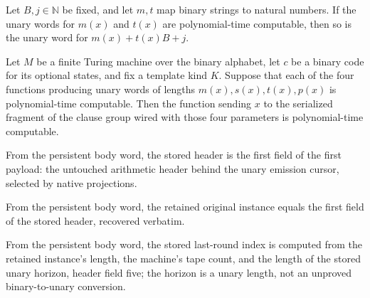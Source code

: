 \begin{lemma}
\label{Complexity.clA5Address_native}
\leanok
{}
Let $B,j\in\mathbb{N}$ be fixed, and let $m,t$ map binary strings to natural numbers. If
the unary words for $m(x)$ and $t(x)$ are polynomial-time computable, then so is the
unary word for $m(x)+t(x)B+j$.
\end{lemma}

\begin{lemma}
\label{Complexity.clA5Group_native}
\leanok
{}
Let $M$ be a finite Turing machine over the binary alphabet, let $c$ be a binary code
for its optional states, and fix a template kind $K$. Suppose that each of the four
functions producing unary words of lengths $m(x),s(x),t(x),p(x)$ is polynomial-time
computable. Then the function sending $x$ to the serialized fragment of the clause group
wired with those four parameters is polynomial-time computable.
\end{lemma}

\begin{definition}
\label{Complexity.clA5StoredHeader}
\leanok
{}
From the persistent body word, the stored header is the first field of the first payload: the untouched arithmetic header behind the unary emission cursor, selected by native projections.
\end{definition}

\begin{definition}
\label{Complexity.clA5Instance}
\leanok
{}
From the persistent body word, the retained original instance equals the first field of the stored header, recovered verbatim.
\end{definition}

\begin{definition}
\label{Complexity.clA5StoredRound}
\leanok
{}
From the persistent body word, the stored last-round index is computed from the retained instance's length, the machine's tape count, and the length of the stored unary horizon, header field five; the horizon is a unary length, not an unproved binary-to-unary conversion.
\end{definition}

